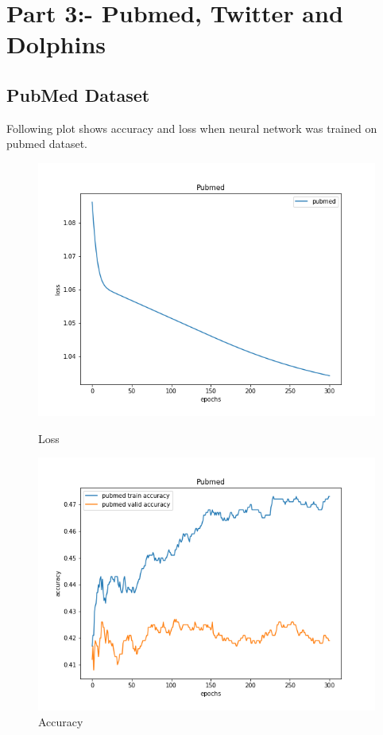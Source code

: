 \documentclass{article}
\begin{document}
\pagebreak
\section{Part 3:- Pubmed, Twitter and Dolphins}
\subsection{PubMed Dataset}
Following plot shows accuracy and loss when neural network was trained on pubmed dataset.

\begin{figure}[!htb]
	\includegraphics[width=\linewidth]{../output_plots/part_3_pubmed_loss.png}
	\caption{Loss}\label{fig:part_3_pubmed_loss}
	\endminipage\hfill
	\includegraphics[width=\linewidth]{../output_plots/part_3_pubmed_accuracy.png}
	\caption{Accuracy}\label{fig:part_3_pubmed_accuracy}
	\endminipage\hfill
\end{figure}
\end{document}
